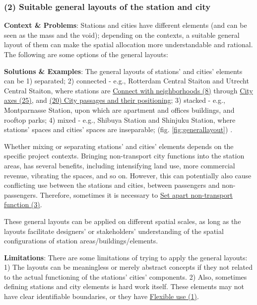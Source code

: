 \documentclass[]{article}
\begin{document}
{\subsubsection{(2) Suitable general layouts of the station and city}
\label{(2) Suitable general layouts of the station and city} 

\textbf{Context \& Problems}: Stations and cities have different elements (and can be seen as the mass and the void); depending on the contexts, a suitable general layout of them can make the spatial allocation more understandable and rational. The following are some options of the general layouts: 

\textbf{Solutions \& Examples}: The general layouts of stations' and cities' elements can be 
1) separated;
2) connected - e.g., Rotterdam Central Staiton and Utrecht Central Staiton, where stations are \hyperref[Connect with neighborhoods]{Connect with neighborhoods (8)} through \hyperref[(25) City axes]{City axes (25)}, and \hyperref[(20 21) City passages and their positioning]{(20) City passages and their positioning};
3) stacked - e.g., Montparnasse Station, upon which are apartment and offices buildings, and rooftop parks;
4) mixed - e.g., Shibuya Station and Shinjuku Station, where stations' spaces and cities' spaces are inseparable;
(fig. \ref{fig:generallayout}) \citep{shikataIntegratedStationCityDevelopment2013, qiAnalysisStationCitySynergetic2019, dewildeMultipleUseSpace2006}.

Whether mixing or separating stations' and cities' elements depends on the specific project contexts. Bringing non-transport city functions into the station areas, has several benefits, including intensifying land use, more commercial revenue, vibrating the spaces, and so on. However, this can potentially also cause conflicting use between the stations and cities, between passengers and non-passengers. Therefore, sometimes it is necessary to \hyperref[(3) Set apart non-transport function]{Set apart non-transport function (3)}.

These general layouts can be applied on different spatial scales, as long as the layouts facilitate designers' or stakeholders' understanding of the spatial configurations of station areas/buildings/elements.

\textbf{Limitations}: There are some limitations of trying to apply the general layouts: 1) The layouts can be meaningless or merely abstract concepts if they not related to the actual functioning of the stations' cities' components. 2) Also, sometimes defining stations and city elements is hard work itself. These elements may not have clear identifiable boundaries, or they have \hyperref[(1) Flexible use]{Flexible use (1)}.

}
\end{document}
